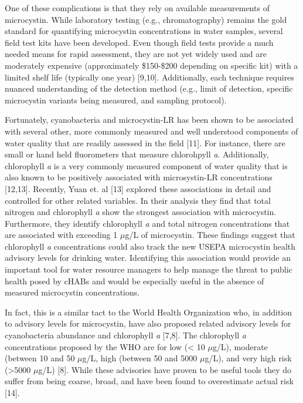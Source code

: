 \documentclass[11pt,]{article}
\begin{document}
One of these complications is that they rely on available measurements
of microcystin. While laboratory testing (e.g., chromatography) remains
the gold standard for quantifying microcystin concentrations in water
samples, several field test kits have been developed. Even though field
tests provide a much needed means for rapid assessment, they are not yet
widely used and are moderately expensive (approximately \$150-\$200
depending on specific kit) with a limited shelf life (typically one
year) {[}9,10{]}. Additionally, each technique requires nuanced
understanding of the detection method (e.g., limit of detection,
specific microcystin variants being measured, and sampling protocol).

Fortunately, cyanobacteria and microcystin-LR has been shown to be
associated with several other, more commonly measured and well
understood components of water quality that are readily assessed in the
field {[}11{]}. For instance, there are small or hand held fluorometers
that measure chlorohpyll \emph{a}. Additionally, chlorophyll \emph{a} is
a very commonly measured component of water quality that is also known
to be positively associated with microsystin-LR concentrations
{[}12,13{]}. Recently, Yuan et. al {[}13{]} explored these associations
in detail and controlled for other related variables. In their analysis
they find that total nitrogen and chlorophyll \emph{a} show the
strongest association with microcystin. Furthermore, they identify
chlorophyll \emph{a} and total nitrogen concentrations that are
associated with exceeding 1 \(\mu\)g/L of microcystin. These findings
suggest that chlorophyll \emph{a} concentrations could also track the
new USEPA microcystin health advisory levels for drinking water.
Identifying this association would provide an important tool for water
resource managers to help manage the threat to public health posed by
cHABs and would be especially useful in the absence of measured
microcystin concentrations.

In fact, this is a similar tact to the World Health Organization who, in
addition to advisory levels for microcystin, have also proposed related
advisory levels for cyanobacteria abundance and chlorophyll \emph{a}
{[}7,8{]}. The chlorophyll \emph{a} concentrations proposed by the WHO
are for low (\textless{} 10 \(\mu\)g/L), moderate (between 10 and 50
\(\mu\)g/L, high (between 50 and 5000 \(\mu\)g/L), and very high risk
(\textgreater{}5000 \(\mu\)g/L) {[}8{]}. While these advisories have
proven to be useful tools they do suffer from being coarse, broad, and
have been found to overestimate actual risk {[}14{]}.
\end{document}

